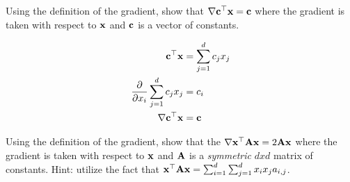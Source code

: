 \documentclass[assignment02_Solutions]{subfiles}
\begin{document}
\begin{exercise}[(25 minutes)]
\bes
\item Using the definition of the gradient, show that $\nabla \mathbf{c}^\top \mathbf{x} = \mathbf{c}$ where the gradient is taken with respect to $\mathbf{x}$ and $\mathbf{c}$ is a vector of constants.

\begin{boxedsolution}

\begin{align}
\mathbf{c}^\top \mathbf{x} &= \sum_{j=1}^d c_j x_j \\
\frac{\partial}{\partial x_i}  \sum_{j=1}^d c_j x_j  &= c_i  \\
\nabla \mathbf{c}^\top \mathbf{x} &= \mathbf{c}
\end{align}

\end{boxedsolution}


\item Using the definition of the gradient, show that the $\nabla \mathbf{x}^\top \mathbf{A} \mathbf{x} = 2 \mathbf{A} \mathbf{x}$ where the gradient is taken with respect to $\mathbf{x}$ and $\mathbf{A}$ is a \emph{symmetric} $dxd$ matrix of constants.  Hint: utilize the fact that $\mathbf{x}^\top \mathbf{A} \mathbf{x} = \sum_{i=1}^d\sum_{j=1}^d x_i x_j a_{i, j}$.%
\ees

\begin{boxedsolution}


\end{boxedsolution}
\end{exercise}
\end{document}
